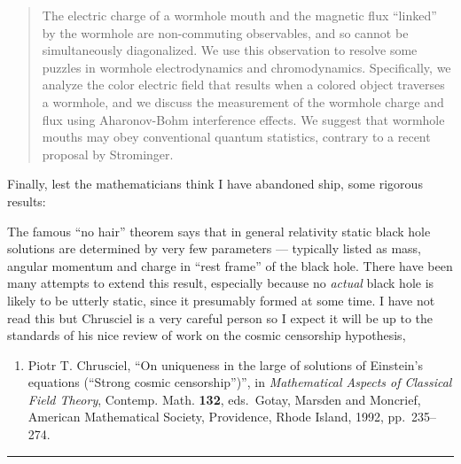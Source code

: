 \documentclass{article}
\def\tightlist{}
\renewcommand{\texttt}[1]{%
  \begingroup
  \ttfamily
  \begingroup\lccode`~=`/\lowercase{\endgroup\def~}{/\discretionary{}{}{}}%
  \begingroup\lccode`~=`[\lowercase{\endgroup\def~}{[\discretionary{}{}{}}%
  \begingroup\lccode`~=`.\lowercase{\endgroup\def~}{.\discretionary{}{}{}}%
  \catcode`/=\active\catcode`[=\active\catcode`.=\active
  \scantokens{#1\noexpand}%
  \endgroup
}
\begin{document}
\begin{quote}
The electric charge of a wormhole mouth and the magnetic flux ``linked''
by the wormhole are non-commuting observables, and so cannot be
simultaneously diagonalized. We use this observation to resolve some
puzzles in wormhole electrodynamics and chromodynamics. Specifically, we
analyze the color electric field that results when a colored object
traverses a wormhole, and we discuss the measurement of the wormhole
charge and flux using Aharonov-Bohm interference effects. We suggest
that wormhole mouths may obey conventional quantum statistics, contrary
to a recent proposal by Strominger.
\end{quote}

Finally, lest the mathematicians think I have abandoned ship, some
rigorous results:

\noindent
The famous ``no hair'' theorem says that in general relativity static
black hole solutions are determined by very few parameters --- typically
listed as mass, angular momentum and charge in ``rest frame'' of the
black hole. There have been many attempts to extend this result,
especially because no \emph{actual} black hole is likely to be utterly
static, since it presumably formed at some time. I have not read this
but Chrusciel is a very careful person so I expect it will be up to the
standards of his nice review of work on the cosmic censorship
hypothesis,

\begin{enumerate}
\def\labelenumi{\arabic{enumi})}
\setcounter{enumi}{8}
\tightlist
\item
  Piotr T. Chrusciel, ``On uniqueness in the large of solutions of Einstein's equations
  (``Strong cosmic censorship'')'', in
  \emph{Mathematical Aspects of Classical Field Theory}, Contemp. Math.
  \textbf{132}, eds.~Gotay, Marsden and Moncrief, American Mathematical
  Society, Providence, Rhode Island,
  1992, pp.~235--274.
\end{enumerate}

\begin{center}\rule{0.5\linewidth}{0.5pt}\end{center}
\end{document}
